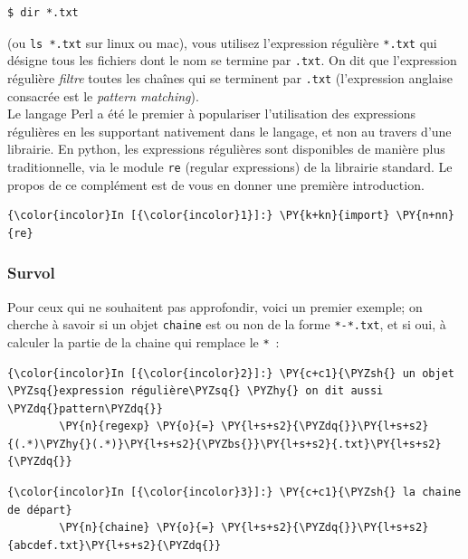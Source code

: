 \begin{verbatim}
$ dir *.txt
\end{verbatim}

(ou \texttt{ls\ *.txt} sur linux ou mac), vous utilisez l'expression
régulière \texttt{*.txt} qui désigne tous les fichiers dont le nom se
termine par \texttt{.txt}. On dit que l'expression régulière
\emph{filtre} toutes les chaînes qui se terminent par \texttt{.txt}
(l'expression anglaise consacrée est le \emph{pattern matching}).\\

    Le langage Perl a été le premier à populariser l'utilisation des
expressions régulières en les supportant nativement dans le langage, et
non au travers d'une librairie. En python, les expressions régulières
sont disponibles de manière plus traditionnelle, via le module
\texttt{re} (regular expressions) de la librairie standard. Le propos de
ce complément est de vous en donner une première introduction.

    \begin{Verbatim}[commandchars=\\\{\}]
{\color{incolor}In [{\color{incolor}1}]:} \PY{k+kn}{import} \PY{n+nn}{re}
\end{Verbatim}


    \hypertarget{survol}{%
\subsubsection{Survol}\label{survol}}

    Pour ceux qui ne souhaitent pas approfondir, voici un premier exemple;
on cherche à savoir si un objet \texttt{chaine} est ou non de la forme
\texttt{*-*.txt}, et si oui, à calculer la partie de la chaine qui
remplace le \texttt{*}~:

    \begin{Verbatim}[commandchars=\\\{\}]
{\color{incolor}In [{\color{incolor}2}]:} \PY{c+c1}{\PYZsh{} un objet \PYZsq{}expression régulière\PYZsq{} \PYZhy{} on dit aussi \PYZdq{}pattern\PYZdq{}}
        \PY{n}{regexp} \PY{o}{=} \PY{l+s+s2}{\PYZdq{}}\PY{l+s+s2}{(.*)\PYZhy{}(.*)}\PY{l+s+s2}{\PYZbs{}}\PY{l+s+s2}{.txt}\PY{l+s+s2}{\PYZdq{}}
\end{Verbatim}


    \begin{Verbatim}[commandchars=\\\{\}]
{\color{incolor}In [{\color{incolor}3}]:} \PY{c+c1}{\PYZsh{} la chaine de départ}
        \PY{n}{chaine} \PY{o}{=} \PY{l+s+s2}{\PYZdq{}}\PY{l+s+s2}{abcdef.txt}\PY{l+s+s2}{\PYZdq{}}
\end{Verbatim}


